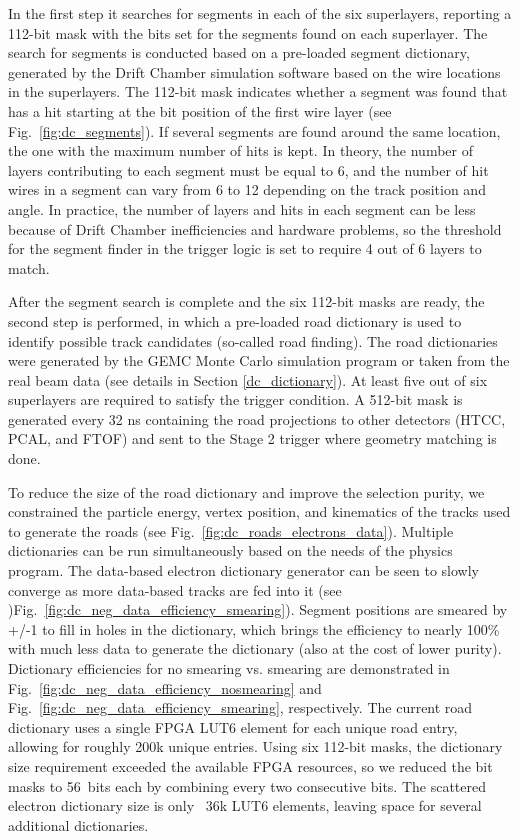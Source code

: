 In the first step it searches for segments in each of the six superlayers, reporting a 112-bit mask with the bits set for the segments found on each superlayer. The search for segments is conducted based on a pre-loaded segment dictionary, generated by the Drift Chamber simulation software based on the wire locations in the superlayers. The 112-bit mask indicates whether a segment was found that has a hit starting at the bit position of the first wire layer (see Fig.~\ref{fig:dc_segments}). If several segments are found around the same location, the one with the maximum number of hits is kept. In theory, the number of layers contributing to each segment must be equal to 6, and the number of hit wires in a segment can vary from 6 to 12 depending on the track position and angle. In practice, the number of layers and hits in each segment can be less because of Drift Chamber inefficiencies and hardware problems, so the threshold for the segment finder in the trigger logic is set to require 4 out of 6 layers to match.

After the segment search is complete and the six 112-bit masks are ready, the second step is performed, in which a pre-loaded road dictionary is used to identify possible track candidates (so-called road finding). The road dictionaries were generated by the GEMC Monte Carlo simulation program or taken from the real beam data (see details in Section \ref{dc_dictionary}). At least five out of six superlayers are required to satisfy the trigger condition. A 512-bit mask is generated every 32 ns containing the road projections to other detectors (HTCC, PCAL, and FTOF) and sent to the Stage 2 trigger where geometry matching is done.

To reduce the size of the road dictionary and improve the selection purity, we constrained the particle energy, vertex position, and kinematics of the tracks used to generate the roads (see Fig.~\ref{fig:dc_roads_electrons_data}). Multiple dictionaries can be run simultaneously based on the needs of the physics program. The data-based electron dictionary generator can be seen to slowly converge as more data-based tracks are fed into it (see )Fig.~\ref{fig:dc_neg_data_efficiency_smearing}). Segment positions are smeared by +/-1 to fill in holes in the dictionary, which brings the efficiency to nearly 100\% with much less data to generate the dictionary (also at the cost of lower purity). Dictionary efficiencies for no smearing vs. smearing are demonstrated in Fig.~\ref{fig:dc_neg_data_efficiency_nosmearing} and Fig.~\ref{fig:dc_neg_data_efficiency_smearing}, respectively. The current road dictionary uses a single FPGA LUT6 element for each unique road entry, allowing for roughly 200k unique entries. Using six 112-bit masks, the dictionary size requirement exceeded the available FPGA resources, so we reduced the bit masks to 56~bits each by combining every two consecutive bits. The scattered electron dictionary size is only ~36k LUT6 elements, leaving space for several additional dictionaries.

